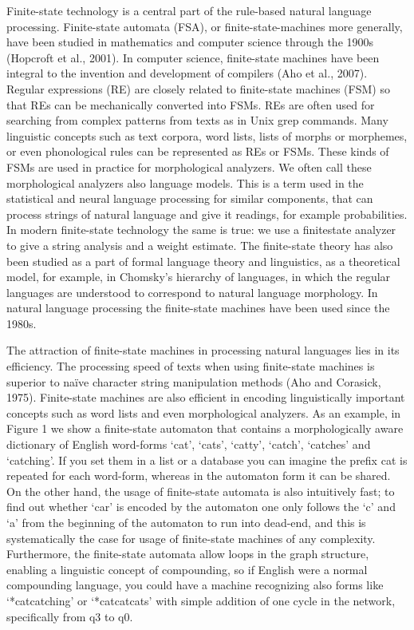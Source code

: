 \documentclass[free]{flammie}
\begin{document}
Finite-state technology is a central part of the rule-based natural language processing.
Finite-state automata (FSA), or finite-state-machines more generally, have been studied in
mathematics and computer science through the 1900s (Hopcroft et al., 2001). In computer
science, finite-state machines have been integral to the invention and development of
compilers (Aho et al., 2007). Regular expressions (RE) are closely related to finite-state
machines (FSM) so that REs can be mechanically converted into FSMs. REs are often used
for searching from complex patterns from texts as in Unix grep commands. Many linguistic
concepts such as text corpora, word lists, lists of morphs or morphemes, or even
phonological rules can be represented as REs or FSMs. These kinds of FSMs are used in
practice for morphological analyzers. We often call these morphological analyzers also
language models. This is a term used in the statistical and neural language processing for
similar components, that can process strings of natural language and give it readings, for
example probabilities. In modern finite-state technology the same is true: we use a finitestate analyzer to give a string analysis and a weight estimate. The finite-state theory has
also been studied as a part of formal language theory and linguistics, as a theoretical model,
for example, in Chomsky’s hierarchy of languages, in which the regular languages are
understood to correspond to natural language morphology. In natural language processing
the finite-state machines have been used since the 1980s.

The attraction of finite-state machines in processing natural languages lies in its
efficiency. The processing speed of texts when using finite-state machines is superior to
naïve character string manipulation methods (Aho and Corasick, 1975). Finite-state
machines are also efficient in encoding linguistically important concepts such as word lists
and even morphological analyzers. As an example, in Figure 1 we show a finite-state
automaton that contains a morphologically aware dictionary of English word-forms ‘cat’,
‘cats’, ‘catty’, ‘catch’, ‘catches’ and ‘catching’. If you set them in a list or a database you
can imagine the prefix cat is repeated for each word-form, whereas in the automaton form
it can be shared. On the other hand, the usage of finite-state automata is also intuitively
fast; to find out whether ‘car’ is encoded by the automaton one only follows the ‘c’ and ‘a’
from the beginning of the automaton to run into dead-end, and this is systematically the
case for usage of finite-state machines of any complexity. Furthermore, the finite-state
automata allow loops in the graph structure, enabling a linguistic concept of compounding,
so if English were a normal compounding language, you could have a machine recognizing
also forms like ‘*catcatching’ or ‘*catcatcats’ with simple addition of one cycle in the
network, specifically from q3 to q0.
\end{document}
